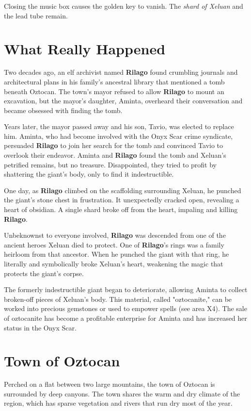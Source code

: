 \documentclass[10pt,a4paper,twoside,bg=print,twocolumn,openany,nodeprecatedcode]{dndbook}
\begin{document}
Closing the music box causes the golden key to vanish. The \textit{shard of Xeluan} and the lead tube remain.

\section{What Really Happened}
Two decades ago, an elf archivist named \textbf{Rilago} found crumbling journals and architectural plans in his family's ancestral library that mentioned a tomb beneath Oztocan. The town's mayor refused to allow \textbf{Rilago} to mount an excavation, but the mayor's daughter, Aminta, overheard their conversation and became obsessed with finding the tomb.

Years later, the mayor passed away and his son, Tavio, was elected to replace him. Aminta, who had become involved with the Onyx Scar crime syndicate, persuaded \textbf{Rilago} to join her search for the tomb and convinced Tavio to overlook their endeavor. Aminta and \textbf{Rilago} found the tomb and Xeluan's petrified remains, but no treasure. Disappointed, they tried to profit by shattering the giant's body, only to find it indestructible.

One day, as \textbf{Rilago} climbed on the scaffolding surrounding Xeluan, he punched the giant's stone chest in frustration. It unexpectedly cracked open, revealing a heart of obsidian. A single shard broke off from the heart, impaling and killing \textbf{Rilago}.

Unbeknownst to everyone involved, \textbf{Rilago} was descended from one of the ancient heroes Xeluan died to protect. One of \textbf{Rilago}'s rings was a family heirloom from that ancestor. When he punched the giant with that ring, he literally and symbolically broke Xeluan's heart, weakening the magic that protects the giant's corpse.

The formerly indestructible giant began to deteriorate, allowing Aminta to collect broken-off pieces of Xeluan's body. This material, called "oztocanite," can be worked into precious gemstones or used to empower spells (see area X4). The sale of oztocanite has become a profitable enterprise for Aminta and has increased her status in the Onyx Scar.

\section{Town of Oztocan}
Perched on a flat between two large mountains, the town of Oztocan is surrounded by deep canyons. The town shares the warm and dry climate of the region, which has sparse vegetation and rivers that run dry most of the year.
\end{document}
